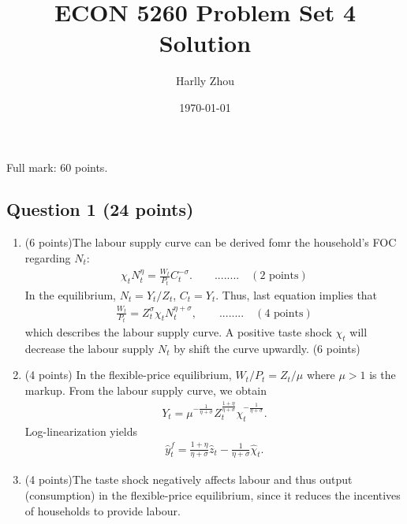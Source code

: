 \documentclass[12pt]{article}
\title{ECON 5260 Problem Set 4 Solution}
\author{Harlly Zhou}
\date{\today}
\begin{document}
\maketitle

Full mark: 60 points.

\subsection*{Question 1 (24 points)}
\begin{enumerate}
    \item (6 points)The labour supply curve can be derived fomr the household's FOC regarding $N_t$:
    \begin{align*}
        \chi_t N_t^{\eta} = \frac{W_t}{P_t} C_t^{-\sigma}. \qquad ........ \quad(2 \text{ points})
    \end{align*}
    In the equilibrium, $N_t = Y_t/Z_t$, $C_t = Y_t$. Thus, last equation implies that
    \begin{align*}
        \frac{W_t}{P_t} = Z_t^{\sigma} \chi_t N_t^{\eta + \sigma}, \qquad ........ \quad(4 \text{ points})
    \end{align*}
    which describes the labour supply curve. A positive taste shock $\chi_t$ will decrease the labour supply $N_t$ by shift the curve upwardly. (6 points)

    \item (4 points) In the flexible-price equilibrium, $W_t/P_t = Z_t/\mu$ where $\mu>1$ is the markup. From the labour supply curve, we obtain
    \begin{align*}
        Y_t = \mu^{-\frac{1}{\eta+\sigma}} Z_t^{\frac{1+\eta}{\eta+\sigma}}\chi_t^{-\frac{1}{\eta+\sigma}}.
    \end{align*}
    Log-linearization yields
    \begin{align*}
        \hat{y}_t^f = \frac{1+\eta}{\eta+\sigma} \hat{z}_t - \frac{1}{\eta+\sigma} \hat{\chi}_t.
    \end{align*}
    
    \item (4 points)The taste shock negatively affects labour and thus output (consumption) in the flexible-price equilibrium, since it reduces the incentives of households to provide labour.


\end{enumerate}
\end{document}

